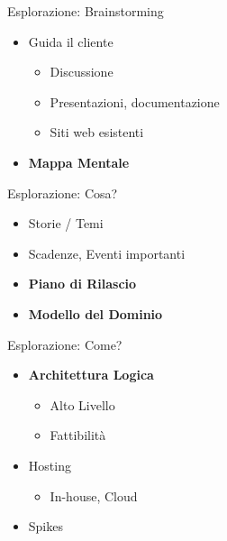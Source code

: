 \documentclass[compress, red, 14pt]{beamer}
\begin{document}
	\begin{frame}{Esplorazione: Brainstorming}
		\begin{itemize}
			\item Guida il cliente
			\begin{itemize}
				\item Discussione
				\item Presentazioni, documentazione
				\item Siti web esistenti
			\end{itemize}
		\end{itemize}	

		\begin{itemize}
			\item \textbf{Mappa Mentale}
		\end{itemize}

	\end{frame}

	\begin{frame}{Esplorazione: Cosa?}
		\begin{itemize}
			\item Storie / Temi
			\item Scadenze, Eventi importanti
		\end{itemize}

		\begin{itemize}
			\item \textbf{Piano di Rilascio}
			\item \textbf{Modello del Dominio}
		\end{itemize}
	\end{frame}

	\begin{frame}{Esplorazione: Come?}
		\begin{itemize}
			\item \textbf{Architettura Logica}
			\begin{itemize}
				\item Alto Livello
				\item Fattibilità
			\end{itemize}
			\item Hosting
			\begin{itemize}
				\item In-house, Cloud
			\end{itemize}
			\item Spikes
		\end{itemize}

	\end{frame}
\end{document}
